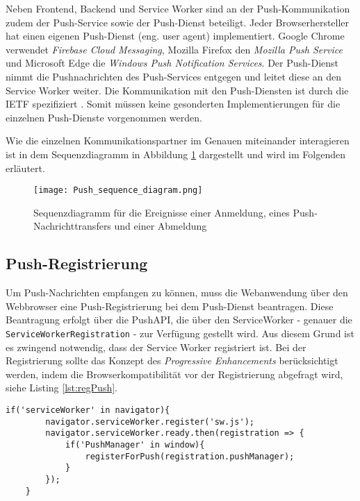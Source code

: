 Neben Frontend, Backend und Service Worker sind an der Push-Kommunikation zudem der Push-Service sowie der Push-Dienst beteiligt. Jeder Browserhersteller hat einen eigenen Push-Dienst (eng. user agent) implementiert. Google Chrome verwendet \textit{Firebase Cloud Messaging}, Mozilla Firefox den \textit{Mozilla Push Service} und Microsoft Edge die \textit{Windows Push Notification Services}. Der Push-Dienst nimmt die Pushnachrichten des Push-Services entgegen und leitet diese an den Service Worker weiter. Die Kommunikation mit den Push-Diensten ist durch die \ac{IETF} spezifiziert \cite{rfc8030}. Somit müssen keine gesonderten Implementierungen für die einzelnen Push-Dienste vorgenommen werden. 

Wie die einzelnen Kommunikationspartner im Genauen miteinander interagieren ist in dem Sequenzdiagramm in Abbildung \ref{img:sequenceDiagram} dargestellt und wird im Folgenden erläutert. 

\newpage
\begin{figure}[!htb]
    \centering
    \texttt{[image: Push\_sequence\_diagram.png]}
    \caption{Sequenzdiagramm für die Ereignisse einer Anmeldung, eines Push-Nachrichttransfers und einer Abmeldung \cite{PushW3}}
    \label{img:sequenceDiagram}
\end{figure}
\newpage


\subsection{Push-Registrierung}\label{sec:pushRegistrirung}

Um Push-Nachrichten empfangen zu können, muss die Webanwendung über den Webbrowser eine Push-Registrierung bei dem Push-Dienst beantragen. Diese Beantragung erfolgt über die PushAPI, die über den ServiceWorker - genauer die \texttt{ServiceWorkerRegistration} - zur Verfügung gestellt wird. Aus diesem Grund ist es zwingend notwendig, dass der Service Worker registriert ist. 
Bei der Registrierung sollte das Konzept des \textit{Progressive Enhancements} berücksichtigt werden, indem die Browserkompatibilität vor der Registrierung abgefragt wird, siehe Listing \ref{lst:regPush}. 

\begin{lstlisting}[caption={Push-Registrierung unter Berücksichtigung der Konzepte des Progressive Enhancements}, label={lst:regPush}, float={!htb}]
    if('serviceWorker' in navigator){
        navigator.serviceWorker.register('sw.js');
        navigator.serviceWorker.ready.then(registration => {
            if('PushManager' in window){
                registerForPush(registration.pushManager);
            }
        });
    }
\end{lstlisting}



